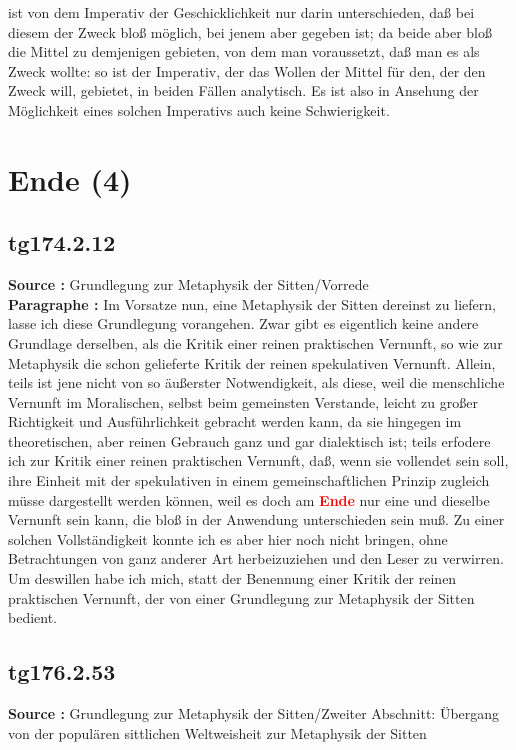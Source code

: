 \documentclass[a4paper,12pt,twoside]{book}
\newcommand{\match}[1]{\textcolor{red}{\textbf{#1}}}
\newcommand{\unnumberedsection}[1]{
	\section*{#1}
	\addcontentsline{toc}{section}{#1}
	\markright{#1}
}
\begin{document}
ist von dem Imperativ der Geschicklichkeit nur darin unterschieden, daß bei diesem der Zweck bloß möglich, bei jenem aber gegeben ist; da beide aber bloß die Mittel zu demjenigen gebieten, von dem man voraussetzt, daß man es als Zweck wollte: so ist der  Imperativ, der das Wollen der Mittel für den, der den Zweck will, gebietet, in beiden Fällen analytisch. Es ist also in Ansehung der Möglichkeit eines solchen Imperativs auch keine Schwierigkeit. 
	
	\unnumberedsection{Ende (4)} 
	\subsection*{tg174.2.12} 
	\textbf{Source : }Grundlegung zur Metaphysik der Sitten/Vorrede\\  
	
	\noindent\textbf{Paragraphe : }Im Vorsatze nun, eine Metaphysik der Sitten dereinst zu liefern, lasse ich diese Grundlegung vorangehen. Zwar gibt  es eigentlich keine andere Grundlage derselben, als die Kritik einer reinen praktischen Vernunft, so wie zur Metaphysik die schon gelieferte Kritik der reinen spekulativen Vernunft. Allein, teils ist jene nicht von so äußerster Notwendigkeit, als diese, weil die menschliche Vernunft im Moralischen, selbst beim gemeinsten Verstande, leicht zu großer Richtigkeit und Ausführlichkeit gebracht werden kann, da sie hingegen im theoretischen, aber reinen Gebrauch ganz und gar dialektisch ist; teils erfodere ich zur Kritik einer reinen praktischen Vernunft, daß, wenn sie vollendet sein soll, ihre Einheit mit der spekulativen in einem gemeinschaftlichen Prinzip zugleich müsse dargestellt werden können, weil es doch am \match{Ende} nur eine und dieselbe Vernunft sein kann, die bloß in der Anwendung unterschieden sein muß. Zu einer solchen Vollständigkeit konnte ich es aber hier noch nicht bringen, ohne Betrachtungen von ganz anderer Art herbeizuziehen und den Leser zu verwirren. Um deswillen habe ich mich, statt der Benennung einer Kritik der reinen praktischen Vernunft, der von einer Grundlegung zur Metaphysik der Sitten bedient. 
	
	\subsection*{tg176.2.53} 
	\textbf{Source : }Grundlegung zur Metaphysik der Sitten/Zweiter Abschnitt: Übergang von der populären sittlichen Weltweisheit zur Metaphysik der Sitten\\  
	
\end{document}
